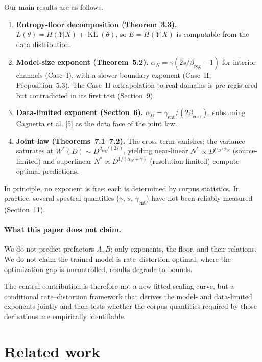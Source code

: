 \documentclass[12pt]{article}
\newcommand{\KL}{\operatorname{KL}}
\theoremstyle{remark}
\begin{document}
Our main results are as follows.
\begin{enumerate}[label=\textbf{(\arabic*)}]
\item \textbf{Entropy-floor decomposition (Theorem~3.3).}
  $L(\theta) = H(Y|X) + \overline{\KL}(\theta)$,
  so $E=H(Y|X)$ is computable from the data distribution.

\item \textbf{Model-size exponent (Theorem~5.2).}
  $\alpha_N = \gamma(2s/\beta_{\mathrm{reg}}-1)$ for interior channels (Case~I),
  with a slower boundary exponent (Case~II, Proposition~5.3).
  The Case~II extrapolation to real domains is pre-registered but contradicted
  in its first test (Section~9).

\item \textbf{Data-limited exponent (Section~6).}
  $\alpha_D = \gamma_{\mathrm{ent}}/(2\beta_{\mathrm{corr}})$, subsuming
  Cagnetta et al. [5] as the data face of the joint law.

\item \textbf{Joint law (Theorems~7.1--7.2).}
  The cross term vanishes; the variance saturates at
  $W^*(D)\!\sim\!D^{\beta_{\mathrm{reg}}/(2s)}$, yielding near-linear
  $N^*\!\propto\!D^{\alpha_D/\alpha_N}$ (source-limited) and superlinear
  $N^*\!\propto\!D^{1/(\alpha_N+\gamma)}$ (resolution-limited)
  compute-optimal predictions.
\end{enumerate}

In principle, no exponent is free: each is determined by corpus statistics. In
practice, several spectral quantities ($\gamma$, $s$, $\gamma_{\mathrm{ent}}$) have
not been reliably measured (Section~11).

\paragraph{What this paper does not claim.}
We do not predict prefactors $A,B$; only exponents, the floor, and their
relations.  We do not claim the trained model is rate--distortion optimal; where
the optimization gap is uncontrolled, results degrade to bounds.

The central contribution is therefore not a new fitted scaling curve, but a
conditional rate--distortion framework that derives the model- and data-limited
exponents jointly and then tests whether the corpus quantities required by those
derivations are empirically identifiable.

\section{Related work}
\label{sec:related}
\end{document}
